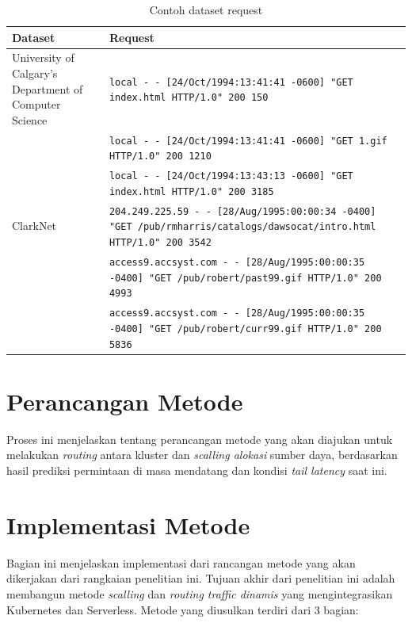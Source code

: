 \begin{table}[htbp]
    \centering
    \caption{Contoh dataset request}
    \label{tab:dataset-request}
    \small
    \begin{tabular}{p{} p{}}
        \toprule
        \textbf{Dataset} & \textbf{Request} \\
        \midrule
        University of Calgary's Department of Computer Science & \texttt{local - - [24/Oct/1994:13:41:41 -0600] "GET index.html HTTP/1.0" 200 150} \\
        & \texttt{local - - [24/Oct/1994:13:41:41 -0600] "GET 1.gif HTTP/1.0" 200 1210} \\
        & \texttt{local - - [24/Oct/1994:13:43:13 -0600] "GET index.html HTTP/1.0" 200 3185} \\
        \midrule
        ClarkNet & \texttt{204.249.225.59 - - [28/Aug/1995:00:00:34 -0400] "GET /pub/rmharris/catalogs/dawsocat/intro.html HTTP/1.0" 200 3542} \\
        & \texttt{access9.accsyst.com - - [28/Aug/1995:00:00:35 -0400] "GET /pub/robert/past99.gif HTTP/1.0" 200 4993} \\
        & \texttt{access9.accsyst.com - - [28/Aug/1995:00:00:35 -0400] "GET /pub/robert/curr99.gif HTTP/1.0" 200 5836} \\
        \bottomrule
    \end{tabular}
\end{table}

\section{Perancangan Metode}
\label{sec:perancangan-metode}

Proses ini menjelaskan tentang perancangan metode yang akan diajukan untuk melakukan \emph{routing} antara kluster dan \emph{scalling alokasi} sumber daya, berdasarkan hasil prediksi permintaan di masa mendatang dan kondisi \emph{tail latency} saat ini.

\section{Implementasi Metode}
\label{sec:implementasi-metode}

Bagian ini menjelaskan implementasi dari rancangan metode yang akan dikerjakan dari rangkaian penelitian ini. Tujuan akhir dari penelitian ini adalah membangun metode \emph{scalling} dan \emph{routing traffic dinamis} yang mengintegrasikan Kubernetes dan Serverless. Metode yang diusulkan terdiri dari 3 bagian:

